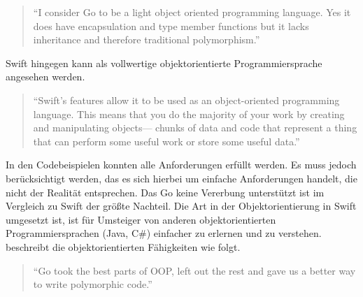 \begin{quote}
\enquote{I consider Go to be a light object oriented programming language. Yes it does have encapsulation and type member functions but it lacks inheritance and therefore traditional polymorphism.} \cite[]{WilliamKennedy.2013}
\end{quote}

Swift hingegen kann als vollwertige objektorientierte Programmiersprache angesehen werden.

\begin{quote}
\enquote{Swift’s features allow it to be used as an object-oriented programming language. This
means that you do the majority of your work by creating and manipulating objects—
chunks of data and code that represent a thing that can perform some useful work or
store some useful data.} \cite[59]{Manning.2016}
\end{quote}

In den Codebeispielen konnten alle Anforderungen erfüllt werden.
Es muss jedoch berücksichtigt werden, das es sich hierbei um einfache Anforderungen handelt, die nicht der Realität entsprechen. 
Das Go keine Vererbung unterstützt ist im Vergleich zu Swift der größte Nachteil.
Die Art in der Objektorientierung in Swift umgesetzt ist, ist für Umsteiger von anderen objektorientierten Programmiersprachen (Java, C\#) einfacher zu erlernen und zu verstehen.
\cite[]{WilliamKennedy.2013} beschreibt die objektorientierten Fähigkeiten wie folgt.

\begin{quote}
\enquote{Go took the best parts of OOP, left out the rest and gave us a better way to write polymorphic code.} \cite[]{WilliamKennedy.2013}
\end{quote}